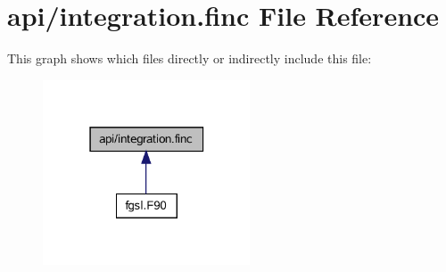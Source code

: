 \hypertarget{integration_8finc}{}\section{api/integration.finc File Reference}
\label{integration_8finc}
This graph shows which files directly or indirectly include this file\+:\nopagebreak
\begin{figure}[H]
\begin{center}
\leavevmode
\includegraphics[width=174pt]{integration_8finc__dep__incl}
\end{center}
\end{figure}
